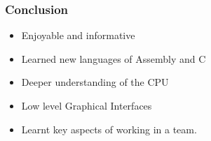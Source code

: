 \documentclass{beamer}
\begin{document}
\begin{frame}

\frametitle{Conclusion}
\begin{itemize}
\item Enjoyable and informative 
\item Learned new languages of Assembly and C
\item Deeper understanding of the CPU
\item Low level Graphical Interfaces
\item Learnt key aspects of working in a team.
\end{itemize}

\end{frame}
\end{document}
